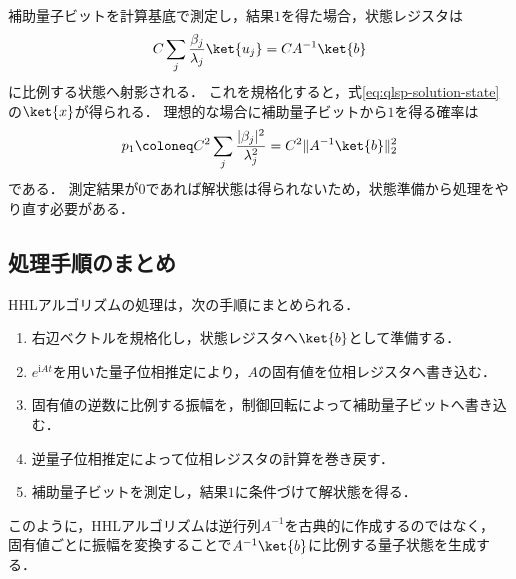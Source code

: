 補助量子ビットを計算基底で測定し，結果$1$を得た場合，状態レジスタは
\begin{align*}
  C\sum_j\frac{\beta_j}{\lambda_j}\ket{u_j}
  =
  CA^{-1}\ket{b}
\end{align*}
に比例する状態へ射影される．
これを規格化すると，式\eqref{eq:qlsp-solution-state}の$\ket{x}$が得られる．
理想的な場合に補助量子ビットから$1$を得る確率は
\begin{equation}
  p_1
  \coloneq
  C^2\sum_j\frac{|\beta_j|^2}{\lambda_j^2}
  =
  C^2\|A^{-1}\ket{b}\|_2^2
  \label{eq:hhl-success-probability}
\end{equation}
である．
測定結果が$0$であれば解状態は得られないため，状態準備から処理をやり直す必要がある．

\subsection{処理手順のまとめ}
\label{subsec:hhl-procedure-summary}

HHLアルゴリズムの処理は，次の手順にまとめられる．

\begin{enumerate}[(1)]
  \item 右辺ベクトルを規格化し，状態レジスタへ$\ket{b}$として準備する．
  \item $e^{\mathrm{i}At}$を用いた量子位相推定により，$A$の固有値を位相レジスタへ書き込む．
  \item 固有値の逆数に比例する振幅を，制御回転によって補助量子ビットへ書き込む．
  \item 逆量子位相推定によって位相レジスタの計算を巻き戻す．
  \item 補助量子ビットを測定し，結果$1$に条件づけて解状態を得る．
\end{enumerate}

このように，HHLアルゴリズムは逆行列$A^{-1}$を古典的に作成するのではなく，
固有値ごとに振幅を変換することで$A^{-1}\ket{b}$に比例する量子状態を生成する．
